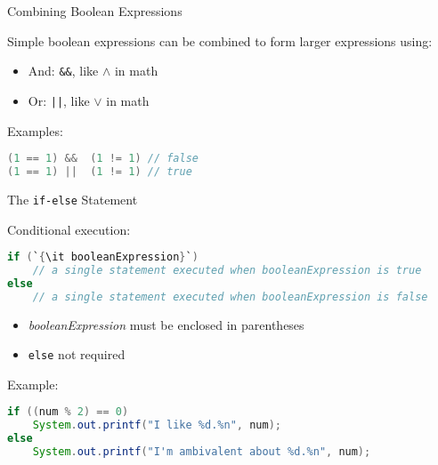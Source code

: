 \documentclass{beamer}
\begin{document}
\begin{frame}[fragile]{Combining Boolean Expressions}


Simple boolean expressions can be combined to form larger expressions using:
\begin{itemize}
\item And: {\tt \&\&}, like $\land$ in math
\item Or: {\tt ||}, like $\lor$ in math
\end{itemize}
Examples:
\begin{lstlisting}[language=Java]
(1 == 1) &&  (1 != 1) // false
(1 == 1) ||  (1 != 1) // true
\end{lstlisting}


\end{frame}

\begin{frame}[fragile]{The {\tt if-else} Statement}


Conditional execution:
\begin{lstlisting}[language=Java,escapechar=`]
if (`{\it booleanExpression}`)
    // a single statement executed when booleanExpression is true
else
    // a single statement executed when booleanExpression is false
\end{lstlisting}
\vspace{-.1in}
\begin{itemize}
\item {\it booleanExpression} must be enclosed in parentheses
\item {\tt else} not required
\end{itemize}

Example:
\begin{lstlisting}[language=Java]
if ((num % 2) == 0)
    System.out.printf("I like %d.%n", num);
else
    System.out.printf("I'm ambivalent about %d.%n", num);
\end{lstlisting}

\end{frame}
\end{document}
